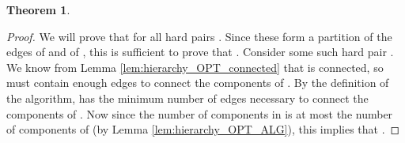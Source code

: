 \documentclass[11pt,letterpaper]{article}
\newtheorem{theorem}{Theorem}[section]
\theoremstyle{definition}
\begin{document}
\begin{theorem} \label{lem:hierarchy_main}

\end{theorem}
\begin{proof}
  We will prove that  for all
  hard pairs .  Since these form a partition of the edges of
   and of , this is sufficient to prove that .  Consider some such hard pair .  We know from Lemma
  \ref{lem:hierarchy_OPT_connected} that  is connected, so  must contain
  enough edges to connect the components of .  By the definition of the algorithm,
   has the minimum number of edges necessary to connect
  the components of .  Now since the number
  of components in  is at most the number
  of components of  (by Lemma
  \ref{lem:hierarchy_OPT_ALG}), this implies that .
\end{proof}


\newpage



\end{document}
